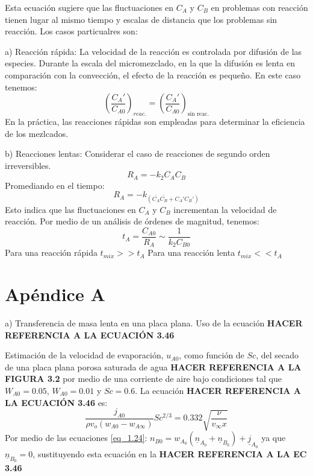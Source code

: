 Esta ecuación sugiere que las fluctuaciones en $C_A$ y $C_B$ en problemas con reacción tienen lugar al mismo tiempo y escalas de distancia que los problemas sin reacción. Los casos particualres son:
\par
a) Reacción rápida: La velocidad de la reacción es controlada por difusión de las especies. Durante la escala del micromezclado, en la que la difusión es lenta en comparación con la convección, el efecto de la reacción es pequeño. En este caso tenemos:
\begin{equation}
            \left( \frac{C_A'}{C_{A0}} \right)_{reac.}=  \left( \frac{C_A'}{C_{A0}} \right)_{\text{sin reac.} }
\end{equation}
En la práctica, las reacciones rápidas son empleadas para determinar la eficiencia de los mezlcados.
\par
b) Reacciones lentas: Considerar el caso de reacciones de segundo orden irreversibles.
\begin{equation}
    R_A=-k_2C_AC_B
\end{equation}
Promediando en el tiempo: 
\begin{equation}
    R_A=-k_(\bar{C_A}\bar{C_B}+C_A'C_B')
\end{equation}
Esto indica que las fluctuaciones en $C_A$ y $C_B$ incrementan la velocidad de reacción. Por medio de un análisis de órdenes de magnitud, tenemos:
\begin{equation}
    t_A=\frac{C_{A0}}{R_A}\sim\frac{1}{k_2C_{B0}}
\end{equation}
Para una reacción rápida $t_{mix}>>t_A$ \newline
Para una reacción lenta $t_{mix}<<t_A$



\newpage
\section* {Apéndice A}
a) Transferencia de masa lenta en una placa plana. Uso de la ecuación \textbf{HACER REFERENCIA A LA ECUACIÓN 3.46}
\newline

Estimación de la velocidad de evaporación, $u_{A0}$, como función de $Sc$, del secado de una placa plana porosa saturada de agua \textbf{HACER REFERENCIA A LA FIGURA 3.2} por medio de una corriente de aire bajo condiciones tal que $W_{A0}=0.05$, $W_{A0}=0.01$ y $Sc=0.6$.
\newline
La ecuación \textbf{HACER REFERENCIA A LA ECUACIÓN 3.46} es:
\begin{equation*}
    \frac{j_{A0}}{\rho v_o(w_{A0}-w_{A\infty})}Sc^{2/3}=0.332\sqrt{\frac{\nu}{v_\infty x}}
\end{equation*}
Por medio de las ecuaciones \eqref{eq_1.24}: $n_{B0}=w_{A_0}(\underline{n}_{A_0}+\underline{n}_{B_0})+\underline{j}_{A_0}$ ya que $\underline{n}_{B_0}=0$, sustituyendo esta ecuación en la \textbf{HACER REFERENCIA A LA EC 3.46}

